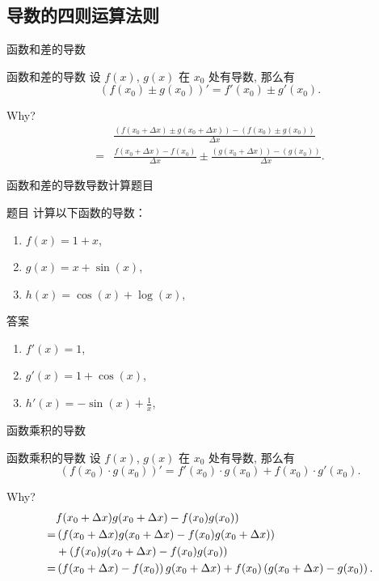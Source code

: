 \documentclass[
10pt,
aspectratio=43,
]{beamer}
\begin{document}
\subsection{导数的四则运算法则}
\begin{frame}{函数和差的导数}
	\begin{block}{函数和差的导数}
		设 $f(x)$, $g(x)$ 在 $x_0$ 处有导数, 那么有
		\[
			(f(x_0)\pm g(x_0))' = f'(x_0)\pm g'(x_0).
		\]
	\end{block}
	\pause
	Why?
	\pause
	\begin{align*}
		  & \frac{(f(x_0+\Delta x)\pm g(x_0+\Delta x))-(f(x_0)\pm g(x_0))}{\Delta x}                  \\
		= & \frac{f(x_0+\Delta x)-f(x_0)}{\Delta x}\pm \frac{( g(x_0+\Delta x))-( g(x_0))}{\Delta x}.
	\end{align*}
\end{frame}

\begin{frame}{函数和差的导数}{导数计算题目}
	\begin{block}{题目}
		计算以下函数的导数：
		\begin{enumerate}
			\item $f(x) = 1 + x$,
			\item $g(x) = x + \sin(x)$,
			\item $h(x) = \cos(x) + \log(x)$,
		\end{enumerate}
	\end{block}

	\pause

	\begin{block}{答案}
		\begin{enumerate}
			\item $f'(x) = 1$,
			\item $g'(x) = 1 + \cos(x)$,
			\item $h'(x) = -\sin(x) + \displaystyle\frac{1}{x}$,
		\end{enumerate}
	\end{block}
\end{frame}

\begin{frame}{函数乘积的导数}
	\begin{block}{函数乘积的导数}
		设 $f(x)$, $g(x)$ 在 $x_0$ 处有导数, 那么有
		\[
			(f(x_0)\cdot g(x_0))' = f'(x_0)\cdot g(x_0) + f(x_0)\cdot g'(x_0).
		\]
	\end{block}
	\pause
	Why?
	\pause
	\begin{align*}
		  & f(x_0+\Delta x)g(x_0+\Delta x)-f(x_0) g(x_0))                                                 \\\bigskip
		= & \left(f(x_0+\Delta x)g(x_0+\Delta x)-f(x_0) g(x_0+\Delta x)\right)                            \\\smallskip
		  & + \left(f(x_0)g(x_0+\Delta x)-f(x_0) g(x_0)\right)                                            \\\bigskip
		= & \left(f(x_0+\Delta x)-f(x_0)\right)g(x_0+\Delta x)+f(x_0)\left(g(x_0+\Delta x)-g(x_0)\right).
	\end{align*}
\end{frame}
\end{document}
